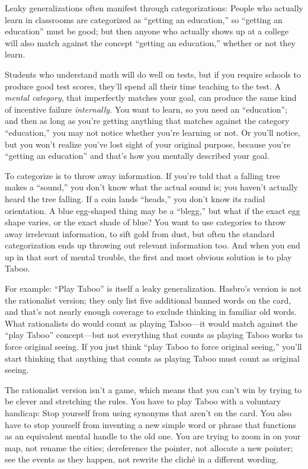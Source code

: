 {
 Leaky generalizations often manifest through categorizations:
People who actually learn in classrooms are categorized as
``getting an education,'' so
``getting an education'' must be
good; but then anyone who actually shows up at a college will also
match against the concept ``getting an
education,'' whether or not they learn.}

{
 Students who understand math will do well on tests, but if you
require schools to produce good test scores, they'll
spend all their time teaching to the test. A \textit{mental category},
that imperfectly matches your goal, can produce the same kind of
incentive failure \textit{internally.} You want to learn, so you need
an ``education''; and then as long
as you're getting anything that matches against the
category ``education,'' you may not
notice whether you're learning or not. Or
you'll notice, but you won't realize
you've lost sight of your original purpose, because
you're ``getting an
education'' and that's how you
mentally described your goal.}

{
 To categorize is to throw away information. If
you're told that a falling tree makes a
``sound,'' you don't
know what the actual sound is; you haven't actually
heard the tree falling. If a coin lands
``heads,'' you don't
know its radial orientation. A blue egg-shaped thing may be a
``blegg,'' but what if the exact egg
shape varies, or the exact shade of blue? You want to use categories to
throw away irrelevant information, to sift gold from dust, but often
the standard categorization ends up throwing out relevant information
too. And when you end up in that sort of mental trouble, the first and
most obvious solution is to play Taboo.}

{
 For example: ``Play Taboo'' is
itself a leaky generalization. Hasbro's version is not
the rationalist version; they only list five additional banned words on
the card, and that's not nearly enough coverage to
exclude thinking in familiar old words. What rationalists do would
count as playing Taboo---it would match against the
``play Taboo'' concept---but not
everything that counts as playing Taboo works to force original seeing.
If you just think ``play Taboo to force original
seeing,'' you'll start thinking that
anything that counts as playing Taboo must count as original seeing.}

{
 The rationalist version isn't a game, which means
that you can't win by trying to be clever and
stretching the rules. You have to play Taboo with a voluntary handicap:
Stop yourself from using synonyms that aren't on the
card. You also have to stop yourself from inventing a new simple word
or phrase that functions as an equivalent mental handle to the old one.
You are trying to zoom in on your map, not rename the cities;
dereference the pointer, not allocate a new pointer; see the events as
they happen, not rewrite the cliché in a different wording.}

